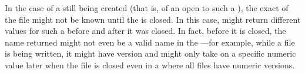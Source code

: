 In the case of a  still being created (that is, of an 
 open to such a ), the exact  of the file
might not be known until the  is closed.  In this case, 
 might return different values for such a 
before and after it was closed.  In fact, before it is closed, the name returned
might not even be a valid name in the ---for example, while a
file is being written, it might have version  and might only take on 
a specific numeric value later when the file is closed even in a 
where all files have numeric versions.

\endsubsubsection%

\endsubsection%
